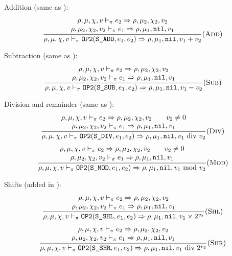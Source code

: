 Addition (same as \Cmm):
\[\dfrac{\begin{array}{c}
    \rho,\mu,\chi,v \vdash_\pi e_2\Rightarrow \rho,\mu_2,\chi_2,v_2 \\
    \rho,\mu_2,\chi_2,v_2 \vdash_\pi e_1\Rightarrow \rho,\mu_1,\texttt{nil},v_1
\end{array}}{\rho,\mu,\chi,v \vdash_\pi \texttt{OP2}(\texttt{S\_ADD}, e_1, e_2) \Rightarrow \rho,\mu_1,\texttt{nil},v_1 + v_2}(\textsc{Add})\]

Subtraction (same as \Cmm):
\[\dfrac{\begin{array}{c}
    \rho,\mu,\chi,v \vdash_\pi e_2\Rightarrow \rho,\mu_2,\chi_2,v_2 \\
    \rho,\mu_2,\chi_2,v_2 \vdash_\pi e_1\Rightarrow \rho,\mu_1,\texttt{nil},v_1
\end{array}}{\rho,\mu,\chi,v \vdash_\pi \texttt{OP2}(\texttt{S\_SUB}, e_1, e_2) \Rightarrow \rho,\mu_1,\texttt{nil},v_1 - v_2}(\textsc{Sub})\]

Division and remainder (same as \Cmm):
\[\dfrac{\begin{array}{c}
    \rho,\mu,\chi,v \vdash_\pi e_2\Rightarrow \rho,\mu_2,\chi_2,v_2 \qquad v_2\ne 0\\
    \rho,\mu_2,\chi_2,v_2 \vdash_\pi e_1\Rightarrow \rho,\mu_1,\texttt{nil},v_1
\end{array}}{\rho,\mu,\chi,v \vdash_\pi \texttt{OP2}(\texttt{S\_DIV}, e_1, e_2) \Rightarrow \rho,\mu_1,\texttt{nil},v_1\text{ div } v_2}(\textsc{Div})\]
\[\dfrac{\begin{array}{c}
    \rho,\mu,\chi,v \vdash_\pi e_2\Rightarrow \rho,\mu_2,\chi_2,v_2 \qquad v_2\ne 0\\
    \rho,\mu_2,\chi_2,v_2 \vdash_\pi e_1\Rightarrow \rho,\mu_1,\texttt{nil},v_1
\end{array}}{\rho,\mu,\chi,v \vdash_\pi \texttt{OP2}(\texttt{S\_MOD}, e_1, e_2) \Rightarrow \rho,\mu_1,\texttt{nil},v_1\text{ mod } v_2}(\textsc{Mod})\]

Shifts (added in \Cmp):
\[\dfrac{\begin{array}{c}
    \rho,\mu,\chi,v \vdash_\pi e_2\Rightarrow \rho,\mu_2,\chi_2,v_2 \\
    \rho,\mu_2,\chi_2,v_2 \vdash_\pi e_1\Rightarrow \rho,\mu_1,\texttt{nil},v_1
\end{array}}{\rho,\mu,\chi,v \vdash_\pi \texttt{OP2}(\texttt{S\_SHL}, e_1, e_2) \Rightarrow \rho,\mu_1,\texttt{nil},v_1\times 2^{v_2}}(\textsc{Shl})\]
\[\dfrac{\begin{array}{c}
    \rho,\mu,\chi,v \vdash_\pi e_2\Rightarrow \rho,\mu_2,\chi_2,v_2 \\
    \rho,\mu_2,\chi_2,v_2 \vdash_\pi e_1\Rightarrow \rho,\mu_1,\texttt{nil},v_1
\end{array}}{\rho,\mu,\chi,v \vdash_\pi \texttt{OP2}(\texttt{S\_SHR}, e_1, e_2) \Rightarrow \rho,\mu_1,\texttt{nil},v_1\text{ div } 2^{v_2}} (\textsc{Shr})\]

